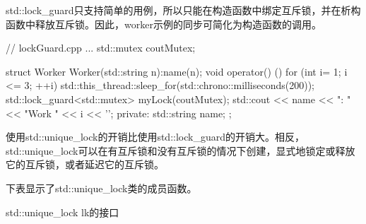 
std::lock\_guard只支持简单的用例，所以只能在构造函数中绑定互斥锁，并在析构函数中释放互斥锁。因此，worker示例的同步可简化为构造函数的调用。


\begin{cpp}
// lockGuard.cpp
...
std::mutex coutMutex;

struct Worker{
	Worker(std::string n):name(n){};
	void operator() (){
		for (int i= 1; i <= 3; ++i){
			std::this_thread::sleep_for(std::chrono::milliseconds(200));
			std::lock_guard<std::mutex> myLock(coutMutex);
			std::cout << name << ": " << "Work " << i << '\n';
		}
	}
	private:
	std::string name;
};
\end{cpp}


使用std::unique\_lock的开销比使用std::lock\_guard的开销大。相反，std::unique\_lock可以在有互斥锁和没有互斥锁的情况下创建，显式地锁定或释放它的互斥锁，或者延迟它的互斥锁。

下表显示了std::unique\_lock类的成员函数。

\begin{center}
std::unique\_lock lk的接口
\end{center}

